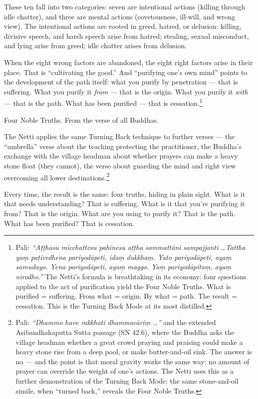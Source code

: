 These ten fall into two categories: seven are intentional actions (killing through idle chatter), and three are mental actions (covetousness, ill-will, and wrong view). The intentional actions are rooted in greed, hatred, or delusion: killing, divisive speech, and harsh speech arise from hatred; stealing, sexual misconduct, and lying arise from greed; idle chatter arises from delusion.

When the eight wrong factors are abandoned, the eight right factors arise in their place. That is ``cultivating the good.'' And ``purifying one's own mind'' points to the development of the path itself: what you purify by penetration --- that is suffering. What you purify it \textit{from} --- that is the origin. What you purify it \textit{with} --- that is the path. What has been purified --- that is cessation.\footnote{Pali: \textit{``Aṭṭhasu micchattesu pahīnesu aṭṭha sammattāni sampajjanti \ldots Tattha yaṃ paṭivedhena pariyodāpeti, idaṃ dukkhaṃ. Yato pariyodāpeti, ayaṃ samudayo. Yena pariyodāpeti, ayaṃ maggo. Yaṃ pariyodāpitaṃ, ayaṃ nirodho.''} The Netti's formula is breathtaking in its economy: four questions applied to the act of purification yield the Four Noble Truths. What is purified = suffering. From what = origin. By what = path. The result = cessation. This is the Turning Back Mode at its most distilled.}

Four Noble Truths. From the verse of all Buddhas.

\ornament

The Netti applies the same Turning Back technique to further verses --- the ``umbrella'' verse about the teaching protecting the practitioner, the Buddha's exchange with the village headman about whether prayers can make a heavy stone float (they cannot), the verse about guarding the mind and right view overcoming all lower destinations.\footnote{Pali: \textit{``Dhammo have rakkhati dhammacāriṃ \ldots''} and the extended Asibandhakaputta Sutta passage (SN 42.6), where the Buddha asks the village headman whether a great crowd praying and praising could make a heavy stone rise from a deep pool, or make butter-and-oil sink. The answer is no --- and the point is that moral gravity works the same way: no amount of prayer can override the weight of one's actions. The Netti uses this as a further demonstration of the Turning Back Mode: the same stone-and-oil simile, when ``turned back,'' reveals the Four Noble Truths.}

Every time, the result is the same: four truths, hiding in plain sight. What is it that needs understanding? That is suffering. What is it that you're purifying it from? That is the origin. What are you using to purify it? That is the path. What has been purified? That is cessation.

